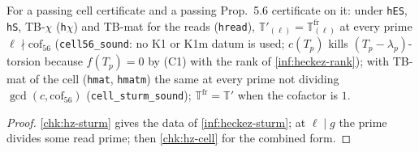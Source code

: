\begin{theorem}\label{chk:hz-cell-sturm}
  \leanok
  For a passing cell certificate and a passing Prop.~5.6 certificate on it: under \texttt{hES}, \texttt{hS}, TB-$\chi$ (\texttt{h$\chi$}) and
  TB-mat for the reads (\texttt{hread}), $\mathbb T'_{(\ell)}=\mathbb T^{\mathrm{fr}}_{(\ell)}$ at every prime $\ell\nmid\mathrm{cof}_{56}$
  (\texttt{cell56\_sound}: no K1 or K1m datum is used; $c(T_p)$ kills $(T_p-\lambda_p)$-torsion because $f(T_p)=0$ by (C1) with the rank of
  \ref{inf:heckez-rank}); with TB-mat of the cell (\texttt{hmat}, \texttt{hmatm}) the same at every prime not dividing
  $\gcd(c,\mathrm{cof}_{56})$ (\texttt{cell\_sturm\_sound}); $\mathbb T^{\mathrm{fr}}=\mathbb T'$ when the cofactor is $1$.
\end{theorem}
\begin{proof}
  \leanok
  \ref{chk:hz-sturm} gives the data of \ref{inf:heckez-sturm}; at $\ell\mid g$ the prime divides some read prime; then
  \ref{chk:hz-cell} for the combined form.
\end{proof}

